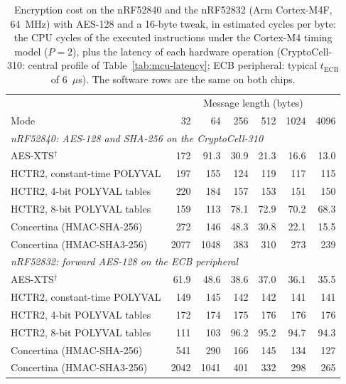 \begin{table}[!hbt]
\caption{Encryption cost on the nRF52840 and the nRF52832 (Arm Cortex-M4F, 64~MHz) with AES-128 and a 16-byte tweak, in estimated cycles per byte: the CPU cycles of the executed instructions under the Cortex-M4 timing model ($P = 2$), plus the latency of each hardware operation (CryptoCell-310: central profile of Table~\ref{tab:mcu-latency}; ECB peripheral: typical $t_\mathrm{ECB}$ of 6~$\mu$s). The software rows are the same on both chips.}
\label{tab:mcu-speed}
\centering
\small
\renewcommand{\arraystretch}{1.25}
\setlength{\tabcolsep}{4pt}
\begin{tabular}{lrrrrrr}
\hline
 & \multicolumn{6}{c}{Message length (bytes)} \\
Mode & 32 & 64 & 256 & 512 & 1024 & 4096 \\
\hline\hline
\multicolumn{7}{l}{\emph{nRF52840: AES-128 and SHA-256 on the CryptoCell-310}} \\
AES-XTS$^\dagger$                                    & 172 & 91.3 & 30.9 & 21.3 & 16.6 & 13.0 \\
HCTR2, constant-time POLYVAL                         & 197 & 155 & 124 & 119 & 117 & 115 \\
HCTR2, 4-bit POLYVAL tables                          & 220 & 184 & 157 & 153 & 151 & 150 \\
HCTR2, 8-bit POLYVAL tables                          & 159 & 113 & 78.1 & 72.9 & 70.2 & 68.3 \\
Concertina (HMAC-SHA-256)                            & 272 & 146 & 48.3 & 30.8 & 22.1 & 15.5 \\
Concertina (HMAC-SHA3-256)                           & 2077 & 1048 & 383 & 310 & 273 & 239 \\
\hline
\multicolumn{7}{l}{\emph{nRF52832: forward AES-128 on the ECB peripheral}} \\
AES-XTS$^\dagger$                                    & 61.9 & 48.6 & 38.6 & 37.0 & 36.1 & 35.5 \\
HCTR2, constant-time POLYVAL                         & 149 & 145 & 142 & 142 & 141 & 141 \\
HCTR2, 4-bit POLYVAL tables                          & 172 & 174 & 175 & 176 & 176 & 176 \\
HCTR2, 8-bit POLYVAL tables                          & 111 & 103 & 96.2 & 95.2 & 94.7 & 94.3 \\
Concertina (HMAC-SHA-256)                            & 541 & 290 & 166 & 145 & 134 & 127 \\
Concertina (HMAC-SHA3-256)                           & 2042 & 1041 & 401 & 332 & 298 & 265 \\

\end{tabular}
\end{table}
